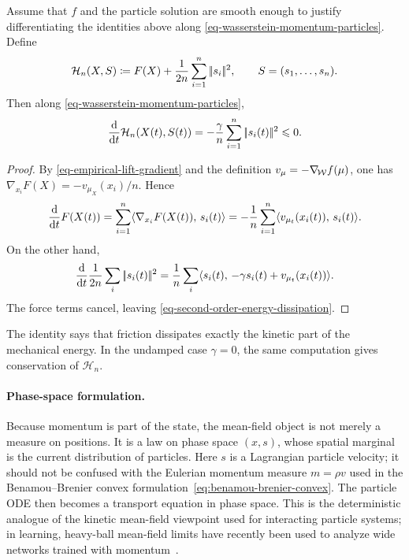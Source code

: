 \begin{prop}\label{prop-second-order-energy-dissipation}
	Assume that $f$ and the particle solution are smooth enough to justify differentiating the identities above along \eqref{eq-wasserstein-momentum-particles}. Define
	\[
		\mathcal H_n(X,S)
		\coloneqq
		F(X)+\frac1{2n}\sum_{i=1}^n|\!| s_i |\!|^2,
		\qquad
		S=(s_1,\ldots,s_n).
	\]
	Then along \eqref{eq-wasserstein-momentum-particles},
	\begin{equation}\label{eq-second-order-energy-dissipation}
		\frac{\mathrm{d}}{\mathrm{d} t}\mathcal H_n(X(t),S(t))
		=
		-\frac{\gamma}{n}\sum_{i=1}^n|\!| s_i(t) |\!|^2
		\leqslant 0 .
	\end{equation}
\end{prop}
\begin{proof}
	By \eqref{eq-empirical-lift-gradient} and the definition $v_\mu=-\nabla_{\!\operatorname{\mathcal{W}}} f(\mu)$, one has $\nabla_{x_i}F(X)=-v_{\mu_X}(x_i)/n$. Hence
	\[
		\frac{\mathrm{d}}{\mathrm{d} t}F(X(t))
		=
		\sum_{i=1}^n \langle \nabla_{x_i}F(X(t)),\,s_i(t)\rangle
		=
		-\frac1n\sum_{i=1}^n\langle v_{\mu_t}(x_i(t)),\,s_i(t)\rangle.
	\]
	On the other hand,
	\[
		\frac{\mathrm{d}}{\mathrm{d} t}\frac1{2n}\sum_i|\!| s_i(t) |\!|^2
		=
		\frac1n\sum_i\langle s_i(t),\,-\gamma s_i(t)+v_{\mu_t}(x_i(t))\rangle.
	\]
	The force terms cancel, leaving \eqref{eq-second-order-energy-dissipation}.
\end{proof}
The identity says that friction dissipates exactly the kinetic part of the mechanical energy. In the undamped case $\gamma=0$, the same computation gives conservation of $\mathcal H_n$.

\paragraph{Phase-space formulation.}
Because momentum is part of the state, the mean-field object is not merely a measure on positions. It is a law on phase space $(x,s)$, whose spatial marginal is the current distribution of particles. Here $s$ is a Lagrangian particle velocity; it should not be confused with the Eulerian momentum measure $m=\rho v$ used in the Benamou--Brenier convex formulation~\eqref{eq:benamou-brenier-convex}. The particle ODE then becomes a transport equation in phase space. This is the deterministic analogue of the kinetic mean-field viewpoint used for interacting particle systems; in learning, heavy-ball mean-field limits have recently been used to analyze wide networks trained with momentum~\cite{WuKungurtsevMondelli2022HeavyBallMeanField}.

